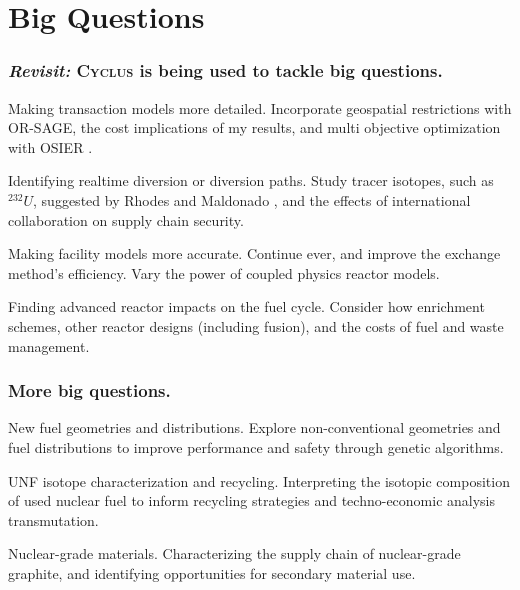 \documentclass[9pt]{beamer}
\newcommand{\cyclus}{\textsc{Cyclus}\xspace}
\begin{document}
  \section{Big Questions}
  \begin{frame}
    \frametitle{\textit{Revisit:} \cyclus is being used to tackle big questions.}
    \begin{block}{Making transaction models more detailed.}
        Incorporate geospatial restrictions with OR-SAGE, the cost implications of my results, and multi objective optimization with OSIER \cite{Dotson_osier}.
    \end{block} \pause
    \begin{block}{Identifying realtime diversion or diversion paths.}
        Study tracer isotopes, such as $^{232}U$, suggested by Rhodes and Maldonado \cite{rhodes_u232}, and the effects of international collaboration on supply chain security.
    \end{block} \pause
    \begin{block}{Making facility models more accurate.}
      Continue \gls{ever}, and improve the exchange method's efficiency. Vary the power of coupled physics reactor models.
    \end{block}\pause
    \begin{block}{Finding advanced reactor impacts on the fuel cycle.}
      Consider how enrichment schemes, other reactor designs (including fusion), and the costs of fuel and waste management.
    \end{block}
  \end{frame}

  \begin{frame}
    \frametitle{More big questions.} %
    \begin{block}{New fuel geometries and distributions.}
      Explore non-conventional geometries and fuel distributions to improve performance and safety through genetic algorithms.
    \end{block} \pause
    \begin{block}{UNF isotope characterization and recycling.}
      Interpreting the isotopic composition of used nuclear fuel to inform recycling strategies and techno-economic analysis transmutation.
    \end{block} \pause
    \begin{block}{Nuclear-grade materials.}
      Characterizing the supply chain of nuclear-grade graphite, and identifying opportunities for secondary material use.
    \end{block}
  \end{frame}
\end{document}
